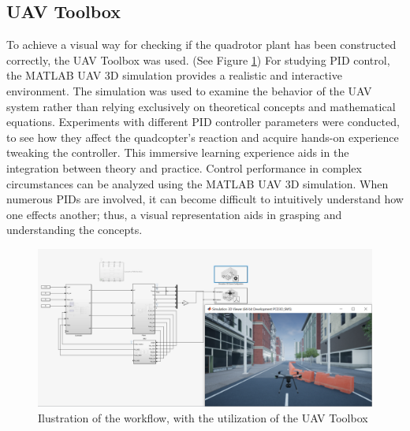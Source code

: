 \subsection{UAV Toolbox}
To achieve a visual way for checking if the quadrotor plant has been constructed correctly, the UAV Toolbox was used. (See Figure \ref{fig:3dsimulation})
For studying PID control, the MATLAB UAV 3D simulation provides a realistic and interactive environment.
The simulation was used to examine the behavior of the UAV system rather than relying exclusively on theoretical concepts and mathematical equations. 
Experiments with different PID controller parameters were conducted, to see how they affect the quadcopter's reaction and acquire hands-on experience tweaking the controller. This immersive learning experience aids in the integration between theory and practice.
Control performance in complex circumstances can be analyzed using the MATLAB UAV 3D simulation. When numerous PIDs are involved, it can become difficult to intuitively understand how one effects another; thus, a visual representation aids in grasping and understanding the concepts.
\begin{figure}[H]
    \begin{center}
    \includegraphics[scale=0.4]{pictures/control/3dsimulation}
    \end{center}
    \caption{Ilustration of the workflow, with the utilization of the UAV Toolbox}
    \label{fig:3dsimulation}
\end{figure}